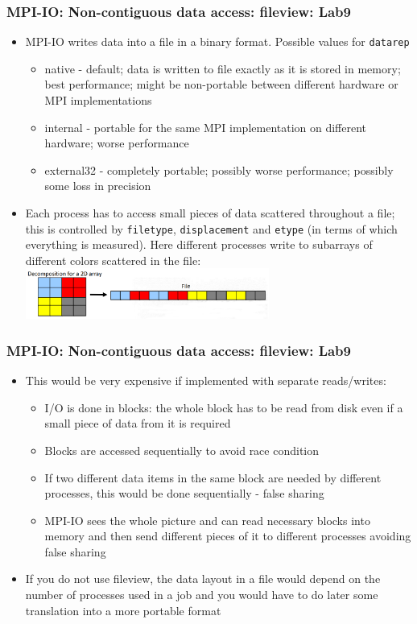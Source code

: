 \documentclass{beamer}
\begin{document}
\begin{frame}[fragile]
  \frametitle{MPI-IO: Non-contiguous data access: fileview: Lab9}
\begin{itemize}
\item MPI-IO writes data into a file in a binary format. Possible values for {\color{mycolorcode}\verb|datarep|}
\begin{itemize}
\item {\color{mycolorcode}native} - default; data is written to file exactly as it is stored in memory; best performance; might be non-portable between different hardware or MPI implementations
\item {\color{mycolorcode}internal} - portable for the same MPI implementation on different hardware; worse performance
\item {\color{mycolorcode}external32} - completely portable; possibly worse performance; possibly some loss in precision
\end{itemize}
\item Each process has to access small pieces of data scattered
throughout a file; this is controlled by {\color{mycolorcode}\verb|filetype|}, {\color{mycolorcode}\verb|displacement|} and {\color{mycolorcode}\verb|etype|} 
(in terms of which everything is measured). Here different processes write to subarrays of different colors scattered in the file:
\includegraphics[width=8.0cm]{graphs/fileview.png}
\end{itemize}
\end{frame}

\begin{frame}[fragile]
  \frametitle{MPI-IO: Non-contiguous data access: fileview: Lab9}
\begin{itemize}
\item This would be very expensive if implemented with separate
reads/writes:
\begin{itemize}
\item I/O is done in blocks: the whole block has to be read from disk even if a small piece of data from it is required
\item Blocks are accessed sequentially to avoid race condition
\item If two different data items in the same block are needed by different processes, this would be done sequentially - false sharing
\item MPI-IO sees the whole picture and can read necessary blocks into memory and then send different pieces of it to different processes avoiding false sharing
\end{itemize}
\item If you do not use fileview, the data layout in a file would depend on the number of processes used in a job and you would have to do later some translation into a more portable format
\end{itemize}
\end{frame}
\end{document}
